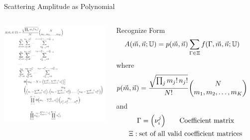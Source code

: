 \begin{frame}{Scattering Amplitude as Polynomial}
%
\begin{columns}[t]
\vspace{-15pt}
\begin{center}
	\includegraphics[width=\linewidth]{./gfx/Amplitude-Exact}
\end{center}
%
Recognize Form
\begin{align*}
	A(\vec{m}, \vec{n}; \mathbb{U})
&=
	p(\vec{m}, \vec{n})
	\sum_{\Gamma \in \Xi}
		f(\Gamma, \vec{m}, \vec{n}; \mathbb{U})
\end{align*}
where
\begin{align*}
	p(\vec{m}, \vec{n})
&=
	\frac
		{\sqrt{\prod_j m_j! \, n_j!}}
		{N!}
	\mqty(
		N \\
		m_1, m_2, \ldots, m_K
	)
\end{align*}
and
\begin{gather*}
	\Gamma
=
	\qty( \nu_i^j )
\qquad
	\text{Coefficient matrix}
\\
	\Xi :
	\text{set of all valid coefficient matrices}
\end{gather*}
\end{columns}
%
\end{frame}


